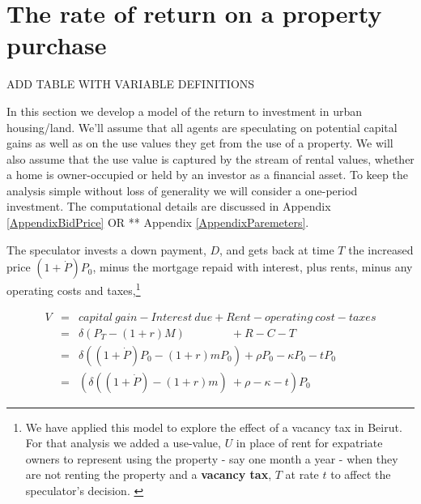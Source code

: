 \section{The rate of return on a property purchase}

ADD TABLE WITH VARIABLE DEFINITIONS
 
 In this section we develop a model of the return to investment in urban housing/land. We'll assume that all agents are speculating on potential capital gains as well as on the use values they get from the use of a property.  We will also assume that the use value is captured by the stream of rental values, whether a home is owner-occupied or  held by an investor as a financial asset. To keep the analysis simple without loss of generality we will consider a one-period investment. The computational details are discussed in Appendix \ref{AppendixBidPrice} OR ** Appendix \ref{AppendixParemeters}.
 
 The speculator  invests a down payment, $D$, and gets back at time $T$ the  increased price $(1+\dot P)P_0$,  minus the mortgage repaid with interest, plus rents, minus any operating costs and taxes,\footnote{We have applied this model to explore the effect of a vacancy tax in Beirut.  For that analysis we  added a use-value, $U$ in place of rent for expatriate owners to represent using the property - say one month a year - when they are not renting the property and a \textbf{vacancy tax}, $T$ at rate $t$ to affect the speculator's  decision. \cite{Al-Shihabi}}

\begin{eqnarray}
V  	&=& capital\ gain - Interest\ due  	+ Rent  - operating\ cost -taxes\\
&=& \delta(P_T- (1+r)M) \qquad \qquad 	 + R  	-C   - T\label{Eqn:V}\\
&=& \delta((1+\dot P)  P_0- (1+r)mP_0)   + \rho P_0  	-\kappa P_0 - tP_0\label{Eqn:V2}\\
&=&( \delta((1+\dot P)  - (1+r)m) \ + \rho   	-\kappa -t) P_0\nonumber
\end{eqnarray}

